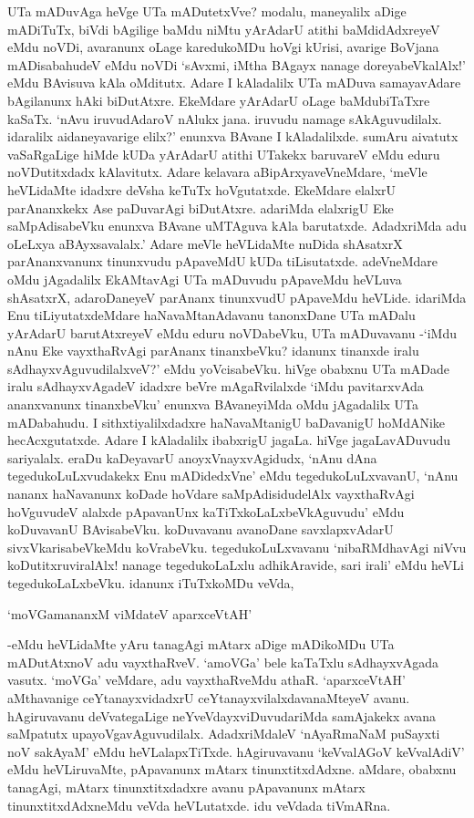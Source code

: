 UTa mADuvAga heVge UTa mADutetxVve? modalu, maneyalilx aDige mADiTuTx, biVdi bAgilige baMdu niMtu yArAdarU atithi baMdidAdxreyeV eMdu noVDi, avaranunx oLage karedukoMDu hoVgi kUrisi, avarige BoVjana mADisabahudeV eMdu noVDi `sAvxmi, iMtha BAgayx nanage doreyabeVkalAlx!' eMdu BAvisuva kAla oMditutx. Adare I kAladalilx UTa mADuva samayavAdare bAgilanunx hAki biDutAtxre. EkeMdare yArAdarU oLage baMdubiTaTxre kaSaTx. `nAvu iruvudAdaroV nAlukx jana. iruvudu namage sAkAguvudilalx. idaralilx aidaneyavarige elilx?' enunxva BAvane I kAladalilxde. sumAru aivatutx vaSaRgaLige hiMde kUDa yArAdarU atithi UTakekx baruvareV eMdu eduru noVDutitxdadx kAlavitutx. Adare kelavara aBipArxyaveVneMdare, `meVle heVLidaMte idadxre deVsha keTuTx hoVgutatxde. EkeMdare elalxrU parAnanxkekx Ase paDuvarAgi biDutAtxre. adariMda elalxrigU Eke saMpAdisabeVku enunxva BAvane uMTAguva kAla barutatxde. AdadxriMda adu oLeLxya aBAyxsavalalx.' Adare meVle heVLidaMte nuDida shAsatxrX parAnanxvanunx tinunxvudu pApaveMdU kUDa tiLisutatxde. adeVneMdare oMdu jAgadalilx EkAMtavAgi UTa mADuvudu pApaveMdu heVLuva shAsatxrX, adaroDaneyeV parAnanx tinunxvudU pApaveMdu heVLide. idariMda Enu tiLiyutatxdeMdare haNavaMtanAdavanu tanonxDane UTa mADalu yArAdarU barutAtxreyeV eMdu eduru noVDabeVku, UTa mADuvavanu -`iMdu nAnu Eke vayxthaRvAgi parAnanx tinanxbeVku? idanunx tinanxde iralu sAdhayxvAguvudilalxveV?' eMdu yoVcisabeVku. hiVge obabxnu UTa mADade iralu sAdhayxvAgadeV idadxre beVre mAgaRvilalxde `iMdu pavitarxvAda ananxvanunx tinanxbeVku' enunxva BAvaneyiMda oMdu jAgadalilx UTa mADabahudu. I sithxtiyalilxdadxre haNavaMtanigU baDavanigU hoMdANike hecAcxgutatxde. Adare I kAladalilx ibabxrigU jagaLa. hiVge jagaLavADuvudu sariyalalx. eraDu kaDeyavarU anoyxVnayxvAgidudx, `nAnu dAna tegedukoLuLxvudakekx Enu mADidedxVne' eMdu tegedukoLuLxvavanU, `nAnu nananx haNavanunx koDade hoVdare saMpAdisidudelAlx vayxthaRvAgi hoVguvudeV alalxde pApavanUnx kaTiTxkoLaLxbeVkAguvudu' eMdu koDuvavanU BAvisabeVku. koDuvavanu avanoDane savxlapxvAdarU sivxVkarisabeVkeMdu koVrabeVku. tegedukoLuLxvavanu `nibaRMdhavAgi niVvu koDutitxruviralAlx! nanage tegedukoLaLxlu adhikAravide, sari irali' eMdu heVLi tegedukoLaLxbeVku. idanunx iTuTxkoMDu veVda,

\begin{shloka}
`moVGamananxM viMdateV aparxceVtAH'
\end{shloka}

-eMdu heVLidaMte yAru tanagAgi mAtarx aDige mADikoMDu UTa mADutAtxnoV adu vayxthaRveV. `amoVGa' bele kaTaTxlu sAdhayxvAgada vasutx. `moVGa' veMdare, adu vayxthaRveMdu athaR. `aparxceVtAH' aMthavanige ceYtanayxvidadxrU ceYtanayxvilalxdavanaMteyeV avanu. hAgiruvavanu deVvategaLige neYveVdayxviDuvudariMda samAjakekx avana saMpatutx upayoVgavAguvudilalx. AdadxriMdaleV `nAyaRmaNaM puSayxti noV sakAyaM' eMdu heVLalapxTiTxde. hAgiruvavanu `keVvalAGoV keVvalAdiV' eMdu heVLiruvaMte, pApavanunx mAtarx tinunxtitxdAdxne. aMdare, obabxnu tanagAgi, mAtarx tinunxtitxdadxre avanu pApavanunx mAtarx tinunxtitxdAdxneMdu veVda heVLutatxde. idu veVdada tiVmARna.

